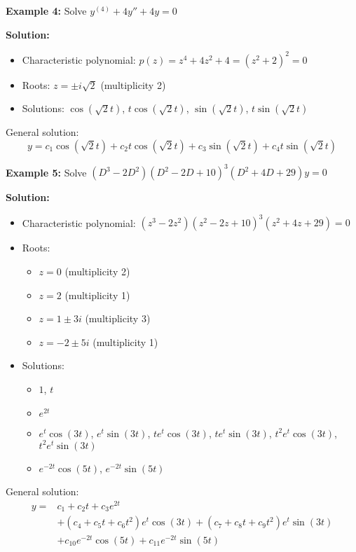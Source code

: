 \documentclass{article}
\begin{document}
\textbf{Example 4:} Solve $y^{(4)} + 4y'' + 4y = 0$

\textbf{Solution:}
\begin{itemize}
    \item Characteristic polynomial: $p(z) = z^4 + 4z^2 + 4 = (z^2+2)^2 = 0$
    \item Roots: $z = \pm i\sqrt{2}$ (multiplicity 2)
    \item Solutions: $\cos(\sqrt{2}t)$, $t\cos(\sqrt{2}t)$, $\sin(\sqrt{2}t)$, $t\sin(\sqrt{2}t)$
\end{itemize}

General solution:
\[
y = c_1\cos(\sqrt{2}t) + c_2t\cos(\sqrt{2}t) + c_3\sin(\sqrt{2}t) + c_4t\sin(\sqrt{2}t)
\]

\textbf{Example 5:} Solve $(D^3-2D^2)(D^2-2D+10)^3(D^2+4D+29)y = 0$

\textbf{Solution:}
\begin{itemize}
    \item Characteristic polynomial: $(z^3-2z^2)(z^2-2z+10)^3(z^2+4z+29) = 0$
    \item Roots:
    \begin{itemize}
        \item $z = 0$ (multiplicity 2)
        \item $z = 2$ (multiplicity 1)
        \item $z = 1 \pm 3i$ (multiplicity 3)
        \item $z = -2 \pm 5i$ (multiplicity 1)
    \end{itemize}
    \item Solutions:
    \begin{itemize}
        \item $1$, $t$
        \item $e^{2t}$
        \item $e^t\cos(3t)$, $e^t\sin(3t)$, $te^t\cos(3t)$, $te^t\sin(3t)$, $t^2e^t\cos(3t)$, $t^2e^t\sin(3t)$
        \item $e^{-2t}\cos(5t)$, $e^{-2t}\sin(5t)$
    \end{itemize}
\end{itemize}

General solution:
\begin{align*}
y = &c_1 + c_2t + c_3e^{2t} \\
&+ (c_4 + c_5t + c_6t^2)e^t\cos(3t) + (c_7 + c_8t + c_9t^2)e^t\sin(3t) \\
&+ c_{10}e^{-2t}\cos(5t) + c_{11}e^{-2t}\sin(5t)
\end{align*}
\end{document}

